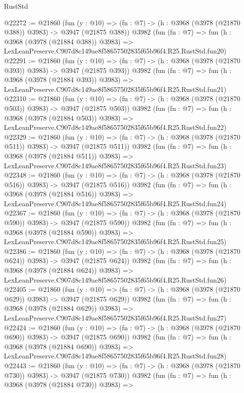 \begin{lexlean}{RustStd}
\begin{coremodule}
@22272 := @21860
    (fun (y : @10) => (fn : @7) -> (h : @3968 (@3978 (@21870 @388)) @3983) -> @3947 (@21875 @388))
    @3982
    (fun (fn : @7) =>
    fun (h : @3968 (@3978 (@21884 @388)) @3983) =>
    LexLeanPreserve.C907d8c149ae8f58657502835f65b96f4.R25.RustStd.fun20)
@22291 := @21860
    (fun (y : @10) => (fn : @7) -> (h : @3968 (@3978 (@21870 @393)) @3983) -> @3947 (@21875 @393))
    @3982
    (fun (fn : @7) =>
    fun (h : @3968 (@3978 (@21884 @393)) @3983) =>
    LexLeanPreserve.C907d8c149ae8f58657502835f65b96f4.R25.RustStd.fun21)
@22310 := @21860
    (fun (y : @10) => (fn : @7) -> (h : @3968 (@3978 (@21870 @503)) @3983) -> @3947 (@21875 @503))
    @3982
    (fun (fn : @7) =>
    fun (h : @3968 (@3978 (@21884 @503)) @3983) =>
    LexLeanPreserve.C907d8c149ae8f58657502835f65b96f4.R25.RustStd.fun22)
@22329 := @21860
    (fun (y : @10) => (fn : @7) -> (h : @3968 (@3978 (@21870 @511)) @3983) -> @3947 (@21875 @511))
    @3982
    (fun (fn : @7) =>
    fun (h : @3968 (@3978 (@21884 @511)) @3983) =>
    LexLeanPreserve.C907d8c149ae8f58657502835f65b96f4.R25.RustStd.fun23)
@22348 := @21860
    (fun (y : @10) => (fn : @7) -> (h : @3968 (@3978 (@21870 @516)) @3983) -> @3947 (@21875 @516))
    @3982
    (fun (fn : @7) =>
    fun (h : @3968 (@3978 (@21884 @516)) @3983) =>
    LexLeanPreserve.C907d8c149ae8f58657502835f65b96f4.R25.RustStd.fun24)
@22367 := @21860
    (fun (y : @10) => (fn : @7) -> (h : @3968 (@3978 (@21870 @590)) @3983) -> @3947 (@21875 @590))
    @3982
    (fun (fn : @7) =>
    fun (h : @3968 (@3978 (@21884 @590)) @3983) =>
    LexLeanPreserve.C907d8c149ae8f58657502835f65b96f4.R25.RustStd.fun25)
@22386 := @21860
    (fun (y : @10) => (fn : @7) -> (h : @3968 (@3978 (@21870 @624)) @3983) -> @3947 (@21875 @624))
    @3982
    (fun (fn : @7) =>
    fun (h : @3968 (@3978 (@21884 @624)) @3983) =>
    LexLeanPreserve.C907d8c149ae8f58657502835f65b96f4.R25.RustStd.fun26)
@22405 := @21860
    (fun (y : @10) => (fn : @7) -> (h : @3968 (@3978 (@21870 @629)) @3983) -> @3947 (@21875 @629))
    @3982
    (fun (fn : @7) =>
    fun (h : @3968 (@3978 (@21884 @629)) @3983) =>
    LexLeanPreserve.C907d8c149ae8f58657502835f65b96f4.R25.RustStd.fun27)
@22424 := @21860
    (fun (y : @10) => (fn : @7) -> (h : @3968 (@3978 (@21870 @690)) @3983) -> @3947 (@21875 @690))
    @3982
    (fun (fn : @7) =>
    fun (h : @3968 (@3978 (@21884 @690)) @3983) =>
    LexLeanPreserve.C907d8c149ae8f58657502835f65b96f4.R25.RustStd.fun28)
@22443 := @21860
    (fun (y : @10) => (fn : @7) -> (h : @3968 (@3978 (@21870 @730)) @3983) -> @3947 (@21875 @730))
    @3982
    (fun (fn : @7) =>
    fun (h : @3968 (@3978 (@21884 @730)) @3983) =>

\end{coremodule}
\end{lexlean}
